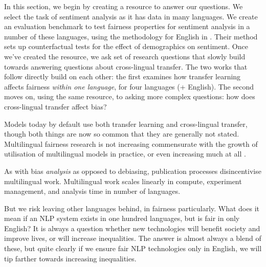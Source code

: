 In this section, we begin by creating a resource to answer our questions. We select the task of sentiment analysis as it has data in many languages. We create an evaluation benchmark to test fairness properties for sentiment analysis in a number of these languages, using the methodology for English in \citet{kiritchenko-mohammad-2018-examining}. Their method sets up counterfactual tests for the effect of demographics on sentiment.  Once we've created the resource, we ask set of research questions that slowly build towards answering questions about cross-lingual transfer. The two works that follow directly build on each other: the first examines how transfer learning affects fairness \textit{within one language}, for four languages (+ English). The second moves on, using the same resource, to asking more complex questions: how does cross-lingual transfer affect bias? 


Models today by default use both transfer learning and cross-lingual transfer, though both things are now so common that they are generally not stated. Multilingual fairness research is not increasing commensurate with the growth of utilisation of multilingual models in practice, or even increasing much at all \citep{ruder-etal-2022-square, blasi-etal-2022-systematic}. 

As with bias \textit{analysis} as opposed to debiasing, publication processes disincentivise multilingual work. Multilingual work scales linearly in compute, experiment management, and analysis time in number of languages.

But we risk leaving other languages behind, in fairness particularly. What does it mean if an NLP system exists in one hundred languages, but is fair in only English? It is always a question whether new technologies will benefit society and improve lives, or will increase inequalities. The answer is almost always a blend of these, but quite clearly if we ensure fair NLP technologies only in English, we will tip farther towards increasing inequalities. 
